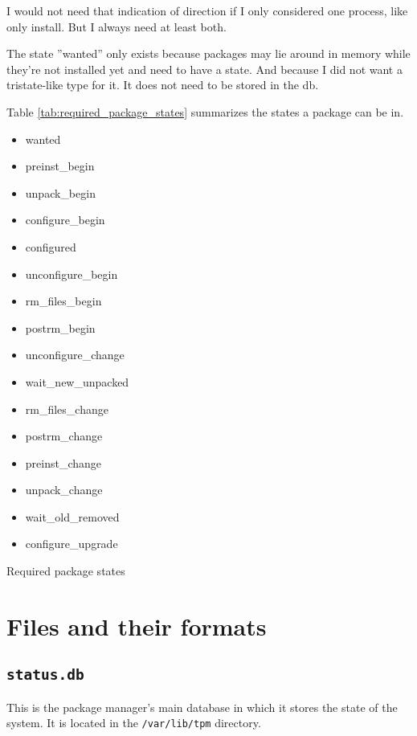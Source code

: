 \documentclass[a4paper]{scrartcl}
\newcommand{\file}[1]{\texttt{#1}}
\begin{document}
	I would not need that indication of direction if I only considered one process, like only install. But I always need at least both.
	
	The state ''wanted'' only exists because packages may lie around in memory while they're not installed yet and need to have a state. And because I did not want a tristate-like type for it. It does not need to be stored in the db.
	
	Table \ref{tab:required_package_states} summarizes the states a package can be in.
	
	\begin{table}[ht]
		\centering
		
		\begin{itemize}
			\item wanted
			\item preinst\_begin
			\item unpack\_begin
			\item configure\_begin
			\item configured
			\item unconfigure\_begin
			\item rm\_files\_begin
			\item postrm\_begin
			\item unconfigure\_change
			\item wait\_new\_unpacked
			\item rm\_files\_change
			\item postrm\_change
			\item preinst\_change
			\item unpack\_change
			\item wait\_old\_removed
			\item configure\_upgrade
		\end{itemize}
		
		\caption{Required package states}
		\label{tab:required_package_states}
	\end{table}


	\section{Files and their formats}
	\label{sec:files_and_their_formats}
	
	
	\subsection{\file{status.db}}
	\label{ssec:status.db}
	
	This is the package manager's main database in which it stores the state of the system. It is located in the \file{/var/lib/tpm} directory.
\end{document}
